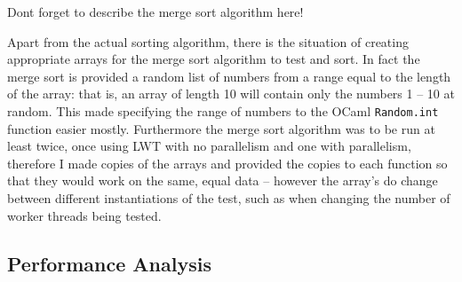 \documentclass[12pt,twoside,notitlepage]{report}
\begin{document}
Dont forget to describe the merge sort algorithm here!

Apart from the actual sorting algorithm, there is the situation of creating appropriate arrays for the merge sort algorithm to test and sort. In fact the merge sort is provided a random list of numbers from a range equal to the length
of the array: that is, an array of length 10 will contain only the numbers 1 -- 10 at random. This made specifying the range of numbers to the OCaml {\tt Random.int} function easier mostly. Furthermore the merge sort algorithm was to
be run at least twice, once using LWT with no parallelism and one with parallelism, therefore I made copies of the arrays and provided the copies to each function so that they would work on the same, equal data -- however the array's
do change between different instantiations of the test, such as when changing the number of worker threads being tested.


\subsection{Performance Analysis}
\end{document}
